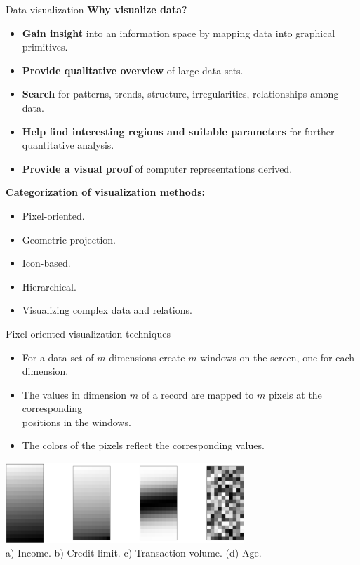 \documentclass[aspectratio=169,t]{beamer}
\begin{document}
  { 
    \begin{frame}{Data visualization}
    \textbf{Why visualize data?}
    \begin{itemize}
      \item \textbf{Gain insight} into an information space by mapping data into graphical primitives.
      \item \textbf{Provide qualitative overview} of large data sets.
      \item \textbf{Search} for patterns, trends, structure, irregularities, relationships among data.
      \item \textbf{Help find interesting regions and suitable parameters} for further quantitative analysis.
      \item \textbf{Provide a visual proof} of computer representations derived.
    \end{itemize}
    \textbf{Categorization of visualization methods:}
    \begin{itemize}
      \item Pixel-oriented.
      \item Geometric projection.
      \item Icon-based.
      \item Hierarchical.
      \item Visualizing complex data and relations.
    \end{itemize}
    \end{frame}
  }

  { 
    \begin{frame}{Pixel oriented visualization techniques}
    \begin{itemize}
      \item For a data set of $m$ dimensions create $m$ windows on the screen, one for each dimension.
      \item The values in dimension $m$ of a record are mapped to $m$ pixels at the corresponding \\ positions in the windows.
      \item The colors of the pixels reflect the corresponding values.
    \end{itemize}
    \vspace{0.5cm}
    \centering
    \includegraphics[width=9cm]{img/pixel.jpg}\\
    a) Income. \hspace{0.3cm} b) Credit limit. \hspace{0.2cm} c) Transaction volume. \hspace{0.2cm} (d) Age.
    \end{frame}
  }
\end{document}
